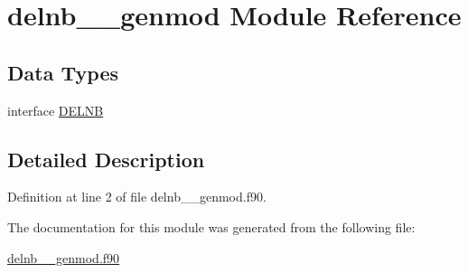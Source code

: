 \hypertarget{classdelnb____genmod}{\section{delnb\+\_\+\+\_\+genmod Module Reference}
\label{classdelnb____genmod}
}
\subsection*{Data Types}
\begin{DoxyCompactItemize}
\item 
interface \hyperlink{interfacedelnb____genmod_1_1DELNB}{D\+E\+L\+N\+B}
\end{DoxyCompactItemize}


\subsection{Detailed Description}


Definition at line 2 of file delnb\+\_\+\+\_\+genmod.\+f90.



The documentation for this module was generated from the following file\+:\begin{DoxyCompactItemize}
\item 
\hyperlink{delnb____genmod_8f90}{delnb\+\_\+\+\_\+genmod.\+f90}\end{DoxyCompactItemize}
